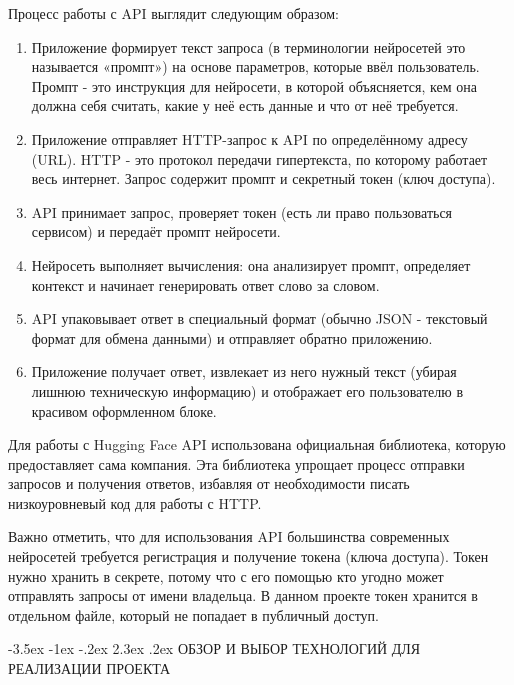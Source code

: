 \documentclass[14pt, a4paper]{extarticle}
\makeatletter
\renewcommand\section{\@startsection {section}{1}{\z@}%
{-3.5ex \@plus -1ex \@minus -.2ex}%
{2.3ex \@plus.2ex}%
{\centering\normalfont\Large\bfseries}}
\makeatother
\begin{document}
\begin{enumerate}
\medskip
\noindent Процесс работы с API выглядит следующим образом:

\begin{enumerate}
\item Приложение формирует текст запроса (в терминологии нейросетей это называется «промпт») на основе параметров, которые ввёл пользователь. Промпт - это инструкция для нейросети, в которой объясняется, кем она должна себя считать, какие у неё есть данные и что от неё требуется.

\item Приложение отправляет HTTP-запрос к API по определённому адресу (URL). HTTP - это протокол передачи гипертекста, по которому работает весь интернет. Запрос содержит промпт и секретный токен (ключ доступа).

\item API принимает запрос, проверяет токен (есть ли право пользоваться сервисом) и передаёт промпт нейросети.

\item Нейросеть выполняет вычисления: она анализирует промпт, определяет контекст и начинает генерировать ответ слово за словом.

\item API упаковывает ответ в специальный формат (обычно JSON - текстовый формат для обмена данными) и отправляет обратно приложению.

\item Приложение получает ответ, извлекает из него нужный текст (убирая лишнюю техническую информацию) и отображает его пользователю в красивом оформленном блоке.
\end{enumerate}

\noindent Для работы с Hugging Face API использована официальная библиотека, которую предоставляет сама компания. Эта библиотека упрощает процесс отправки запросов и получения ответов, избавляя от необходимости писать низкоуровневый код для работы с HTTP.

\medskip
\noindent Важно отметить, что для использования API большинства современных нейросетей требуется регистрация и получение токена (ключа доступа). Токен нужно хранить в секрете, потому что с его помощью кто угодно может отправлять запросы от имени владельца. В данном проекте токен хранится в отдельном файле, который не попадает в публичный доступ.

\newpage
\section{ОБЗОР И ВЫБОР ТЕХНОЛОГИЙ ДЛЯ РЕАЛИЗАЦИИ ПРОЕКТА}


\end{enumerate}
\end{document}

